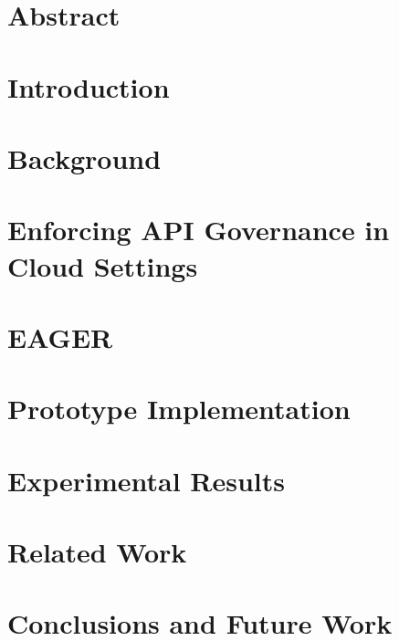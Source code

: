 \section{Abstract}


\section{Introduction}
\label{sec:eager_intro}


\section{Background}
\label{sec:eager_bg}


\section{Enforcing API Governance in Cloud Settings}
\label{sec:eager_enforce}


\section{EAGER}
\label{sec:eager_eager}


\section{Prototype Implementation}
\label{sec:eager_prototype_impl}


\section{Experimental Results}
\label{sec:eager_results}


\section{Related Work}
\label{sec:eager_related_work}


\section{Conclusions and Future Work}
\label{sec:eager_conc}

